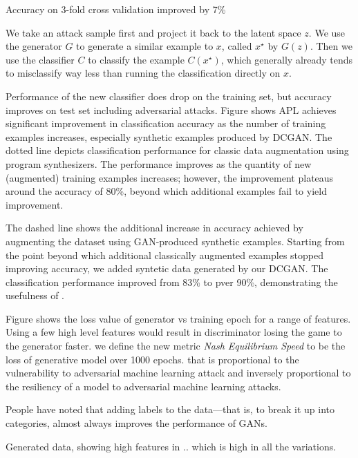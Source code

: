 Accuracy on 3-fold cross validation improved by 7\%


We take an attack sample first and project it back to the latent space $z$.
We use the generator $G$ to generate a similar example to $x$, called ${x^{\star}}$ by $G(z)$. Then we use the classifier $C$ to classify the example $C(x^{\star})$, which generally already tends to misclassify way less than running the classification directly on $x$. 

Performance of the new classifier does drop on the training set, but accuracy improves on test set including adversarial attacks. Figure shows APL achieves significant improvement in classification accuracy as the number of training examples increases, especially synthetic examples produced by DCGAN. The dotted line depicts classification performance for classic data augmentation using program synthesizers. The performance improves as the quantity of new (augmented) training examples increases; however, the improvement plateaus around the accuracy of 80\%, beyond which additional examples fail to yield improvement. 

The dashed line shows the additional increase in accuracy achieved by augmenting the dataset using GAN-produced synthetic examples. Starting from the point beyond which additional classically augmented examples stopped improving accuracy, we added syntetic data generated by our DCGAN. The classification performance improved from 83\% to pver 90\%, demonstrating the usefulness of \scheme. 

Figure shows the loss value of generator vs training epoch for a range of features. Using a few high level features would result in discriminator losing the game to the generator faster. we define the new metric {\em Nash Equilibrium Speed} to be the loss of generative model over 1000 epochs. that is proportional to the vulnerability to adversarial machine learning attack and  inversely proportional  to the resiliency of a model to adversarial machine learning attacks. 

People have noted that adding labels to the data—that is, to break it up into categories, almost always improves the performance of GANs.

Generated data, showing high features in .. which is high in all the variations. 





